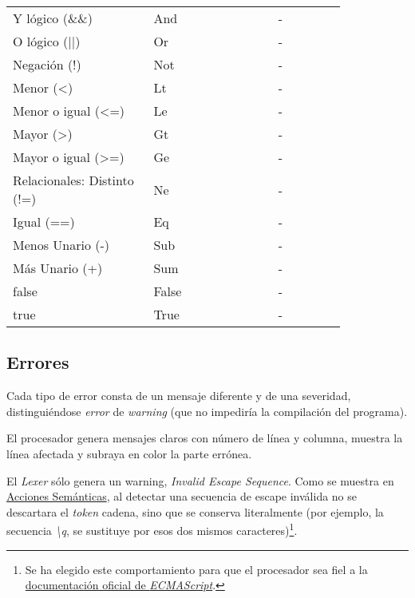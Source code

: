 \documentclass[a4paper]{CSMakotoTechnicalReport}
\begin{document}
\begin{multicols}{2}
\begin{table}[H]
\begin{tabular}{L{0.35\linewidth} L{0.31\linewidth} L{0.17\linewidth}}
            Y lógico (\&\&) & And & - \\
            O lógico (||) & Or & - \\
            Negación (!) & Not & - \\
            Menor (<) & Lt & - \\
            Menor o igual (<=) & Le & - \\
            Mayor (>) & Gt & - \\
            Mayor o igual (>=) & Ge & - \\
            Relacionales: Distinto (!=) & Ne & - \\
            Igual (==) & Eq & - \\
            Menos Unario (-) & Sub & - \\
            Más Unario (+) & Sum & - \\
            false & False & - \\
            true & True & - \\
            \bottomrule
        \end{tabular}
        \label{tab:tokens}
    \end{table}

    \subsection{Errores}

    Cada tipo de error consta de un mensaje diferente y de una severidad, distinguiéndose \textit{error} de \textit{warning} (que no impediría la compilación del programa).

    El procesador genera mensajes claros con número de línea y columna, muestra la línea afectada y subraya en color la parte errónea.

    El \textit{Lexer} sólo genera un warning, \textit{Invalid Escape Sequence}. Como se muestra en \hyperref[subsec:acciones-semanticas]{Acciones Semánticas}, al detectar una secuencia de escape inválida no se descartara el \textit{token} cadena, sino que se conserva literalmente (por ejemplo, la secuencia \textit{\textbackslash q}, se sustituye por esos dos mismos caracteres)\footnote{Se ha elegido este comportamiento para que el procesador sea fiel a la \href{https://tc39.es/ecma262/multipage/ecmascript-language-lexical-grammar.html\#sec-literals-string-literals}{documentación oficial de \textit{ECMAScript}}.}.


\end{multicols}
\end{document}
